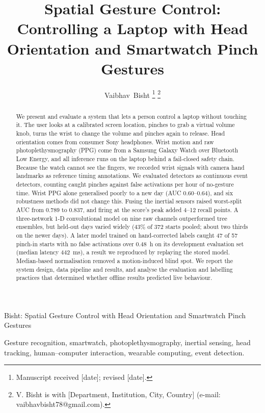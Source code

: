 \documentclass[journal]{IEEEtran}
\begin{document}
\title{Spatial Gesture Control: Controlling a Laptop with Head Orientation and Smartwatch Pinch Gestures}

\author{Vaibhav~Bisht%
\thanks{Manuscript received [date]; revised [date].}%
\thanks{V. Bisht is with [Department, Institution, City, Country] (e-mail: vaibhavbisht78@gmail.com).}}

%
{Bisht: Spatial Gesture Control with Head Orientation and Smartwatch Pinch Gestures}

\maketitle

\begin{abstract}
We present and evaluate a system that lets a person control a laptop without touching it. The user looks at a calibrated screen location, pinches to grab a virtual volume knob, turns the wrist to change the volume and pinches again to release. Head orientation comes from consumer Sony headphones. Wrist motion and raw photoplethysmography (PPG) come from a Samsung Galaxy Watch over Bluetooth Low Energy, and all inference runs on the laptop behind a fail-closed safety chain. Because the watch cannot see the fingers, we recorded wrist signals with camera hand landmarks as reference timing annotations. We evaluated detectors as continuous event detectors, counting caught pinches against false activations per hour of no-gesture time. Wrist PPG alone generalised poorly to a new day (AUC 0.60--0.64), and six robustness methods did not change this. Fusing the inertial sensors raised worst-split AUC from 0.789 to 0.837, and firing at the score's peak added 4--12 recall points. A three-network 1-D convolutional model on nine raw channels outperformed tree ensembles, but held-out days varied widely (43\% of 372 starts pooled; about two thirds on the newer days). A later model trained on hand-corrected labels caught 47 of 57 pinch-in starts with no false activations over 0.48~h on its development evaluation set (median latency 442~ms), a result we reproduced by replaying the stored model. Median-based normalisation removed a motion-induced blind spot. We report the system design, data pipeline and results, and analyse the evaluation and labelling practices that determined whether offline results predicted live behaviour.
\end{abstract}

\begin{IEEEkeywords}
Gesture recognition, smartwatch, photoplethysmography, inertial sensing, head tracking, human--computer interaction, wearable computing, event detection.
\end{IEEEkeywords}
\end{document}
